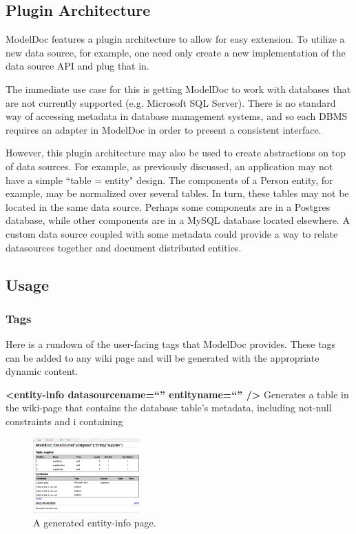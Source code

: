 \documentclass[nocopyrightspace]{acm_proc_article-sp}
\begin{document}
\subsection{Plugin Architecture}

ModelDoc features a plugin architecture to allow for easy extension.  To
utilize a new data source, for example, one need only create a new
implementation of the data source API and plug that in.

The immediate use case for this is getting ModelDoc to work with databases that
are not currently supported (e.g. Microsoft SQL Server).  There is no standard
way of accessing metadata in database management systems, and so each DBMS requires an adapter in ModelDoc
in order to present a consistent interface.

However, this plugin architecture may also be used to create abstractions on
top of data sources.  For example, as previously discussed, an application
may not have a simple ``table = entity" design.  The components of a Person
entity, for example, may be normalized over several tables.  In turn, these
tables may not be located in the same data source.  Perhaps some components are
in a Postgres database, while other components are in a MySQL database located
elsewhere.  A custom data source coupled with some metadata could provide a way
to relate datasources together and document distributed entities.

\subsection{Usage}

\subsubsection{Tags}
Here is a rundown of the user-facing tags that ModelDoc provides.  These tags
can be added to any wiki page and will be generated with the appropriate
dynamic content.

\textbf{<entity-info datasourcename=``'' entityname=``'' />}
Generates a table in the wiki-page that contains the database table's metadata,
including not-null constraints and i containing

\begin{figure}[htbp]
\centering
\includegraphics[width=155px]{entity-info.pdf}
\caption{A generated entity-info page.}
\end{figure}
\end{document}
